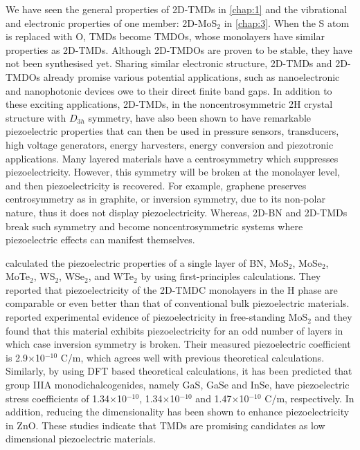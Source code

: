 We have seen the general properties of 2D-TMDs in \autoref{chap:1} and the vibrational and electronic properties of one member: 2D-MoS$_2$ in \autoref{chap:3}. When the S atom is replaced with O, TMDs become TMDOs, whose monolayers have similar properties as 2D-TMDs. Although 2D-TMDOs are proven to be stable, they have not been synthesised yet. Sharing similar electronic structure, 2D-TMDs and 2D-TMDOs already promise various potential applications, such as nanoelectronic and nanophotonic devices owe to their direct finite band gaps\cite{Jariwala2014,Wang2012}. In addition to these exciting applications, 2D-TMDs, in the noncentrosymmetric 2H crystal structure with $D_{3h}$ symmetry, have also been shown to have remarkable piezoelectric properties that can then be used in pressure sensors, transducers, high voltage generators, energy harvesters, energy conversion and piezotronic applications. Many layered materials have a centrosymmetry which suppresses piezoelectricity. However, this symmetry will be broken at the monolayer level, and then piezoelectricity is recovered. For example, graphene preserves centrosymmetry as in graphite, or inversion symmetry, due to its non-polar nature, thus it does not display piezoelectricity. Whereas, 2D-BN and 2D-TMDs break such symmetry and become noncentrosymmetric systems where piezoelectric effects can manifest themselves. 

\citet{Duerloo2012} calculated the piezoelectric properties of a single layer of BN, MoS$_2$, MoSe$_2$, MoTe$_2$, WS$_2$, WSe$_2$, and WTe$_2$ by using first-principles calculations. They reported that piezoelectricity of the 2D-TMDC monolayers in the H phase are comparable or even better than that of conventional bulk piezoelectric materials. \citet{Zhu2015} reported 
experimental evidence of piezoelectricity in free-standing MoS$_2$ and they found that this material exhibits piezoelectricity for an odd number of layers in which case inversion symmetry is broken. Their measured piezoelectric coefficient is 2.9$\times$10$^{-10}$ C/m, which agrees well with previous theoretical calculations\cite{Duerloo2012}.  Similarly, by using DFT based theoretical calculations, it has been predicted that group IIIA monodichalcogenides, namely GaS, GaSe and InSe, have piezoelectric stress coefficients of 1.34$\times$10$^{-10}$, 1.34$\times$10$^{-10}$ and 1.47$\times$10$^{-10}$ C/m, respectively\cite{Li2015a}.  In addition, reducing the dimensionality has been shown to enhance piezoelectricity in ZnO\cite{Xiang2006}. These studies indicate that TMDs are promising candidates as low dimensional piezoelectric materials. 

